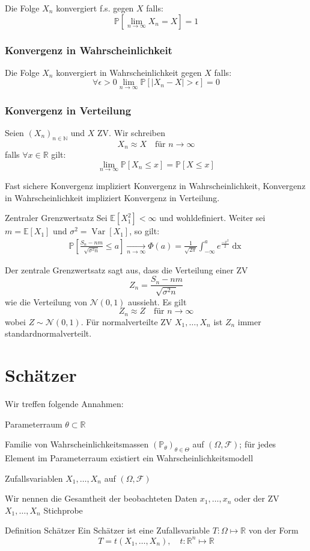 \documentclass[a4paper,10pt]{article}
\def\R{\mathbb{R}}
\def\P{\mathbb{P}}
\def\F{\mathcal{F}}
\def\E{\mathbb{E}}
\DeclareMathOperator{\Var}{\text{Var}}
\begin{document}
Die Folge $X_n$ konvergiert f.s. gegen $X$ falls:
$$
	\P \left[ \lim_{n \to \infty} X_n = X \right] = 1
$$

\subsubsection*{Konvergenz in Wahrscheinlichkeit}

Die Folge $X_n$ konvergiert in Wahrscheinlichkeit gegen $X$ falls:
$$
	\forall \epsilon > 0 \lim_{n \to \infty} \P \left[ \left| X_n - X \right| > \epsilon \right] = 0
$$

\subsubsection*{Konvergenz in Verteilung}
Seien \((X_n)_{n\in \mathbb{N}}\) und \(X\) ZV. Wir schreiben
\[X_n \approx X \quad \text{für } n \to \infty\]
falls \(\forall x \in \R\) gilt:
\[\lim_{n\to\infty} \P[X_n \le x] = \P[X \le x ]\]

Fast sichere Konvergenz impliziert Konvergenz in Wahrscheinlichkeit, Konvergenz in Wahrscheinlichkeit impliziert Konvergenz in Verteilung.

\begin{mainbox}{Zentraler Grenzwertsatz}
	Sei \(\E[X^2_1] < \infty\) und wohldefiniert. Weiter sei \(m = \E[X_1]\) und \(\sigma^2 = \Var[X_1]\), so gilt:
	\begin{align*}
		\P\left[\frac{S_n - nm}{\sqrt{\sigma^2 n}} \leq a\right] \xrightarrow[n \to \infty]{} \Phi(a) = \frac{1}{\sqrt{2 \pi}} \int_{-\infty}^a e^{\frac{-x^2}{2}} \mathop{dx}
	\end{align*}
\end{mainbox}
Der zentrale Grenzwertsatz sagt aus, dass die Verteilung einer ZV
\[Z_n = \frac{S_n - nm}{\sqrt{\sigma^2 n}}\]
wie die Verteilung von \(\mathcal{N}(0,1)\) aussieht. Es gilt
\[Z_n \approx Z \quad \text{für } n\to \infty\]
wobei \(Z \sim \mathcal{N}(0,1)\). Für normalverteilte ZV \(X_1, \ldots, X_n\) ist \(Z_n\) immer standardnormalverteilt.

\section{Schätzer}
Wir treffen folgende Annahmen:
\begin{rowlist}
	\item Parameterraum \(\theta \subset \R\)
	\item Familie von Wahrscheinlichkeitsmassen \((\P_\theta)_{\theta \in \Theta}\) auf \((\Omega, \F)\); für jedes Element im Parameterraum existiert ein Wahrscheinlichkeitsmodell
	\item Zufallsvariablen \(X_1, \ldots, X_n\) auf \((\Omega, \F)\)
	\item Wir nennen die Gesamtheit der beobachteten Daten \(x_1, \ldots, x_n\) oder der ZV \(X_1, \ldots, X_n\) Stichprobe
\end{rowlist}
\begin{mainbox}{Definition Schätzer}
	Ein Schätzer ist eine Zufallsvariable \(T: \Omega \mapsto \R\) von der Form
	\[T = t(X_1, \ldots, X_n), \quad t: \R^n \mapsto \R\]
\end{mainbox}
\end{document}
